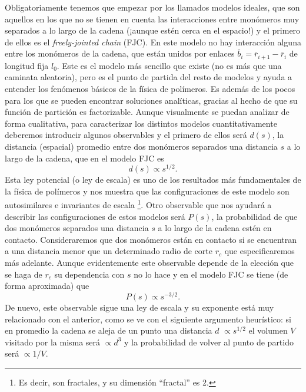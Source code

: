 Obligatoriamente tenemos que empezar por los llamados modelos ideales, que son aquellos en los que no se tienen en cuenta las interacciones entre monómeros muy separados a lo largo de la cadena (¡aunque estén cerca en el espacio!) y el primero de ellos es el \textit{freely-jointed chain} (FJC). En este modelo no hay interacción alguna entre los monómeros de la cadena, que están unidos por enlaces $\bar{b}_i=\bar{r}_{i+1}-\bar{r}_i$ de longitud fija $l_0$. Este es el modelo más sencillo que existe (no es más que una caminata aleatoria), pero es el punto de partida del resto de modelos y ayuda a entender los fenómenos básicos de la física de polímeros. Es además de los pocos para los que se pueden encontrar soluciones analíticas, gracias al hecho de que su función de partición es factorizable. Aunque visualmente se puedan analizar de forma cualitativa, para caracterizar los distintos modelos cuantitativamente deberemos introducir algunos observables y el primero de ellos será $d(s)$, la distancia (espacial) promedio entre dos monómeros separados una distancia $s$ a lo largo de la cadena, que en el modelo FJC es \cite{Theodorakopoulos2019}
\begin{equation}
    \label{eq:ideal_sd}
    d(s)\propto s^{1/2}.
\end{equation}
Esta ley potencial (o ley de escala) es uno de los resultados más fundamentales de la física de polímeros y nos muestra que las configuraciones de este modelo son autosimilares e invariantes de escala \footnote{Es decir, son fractales, y su dimensión ``fractal'' es 2.}. Otro observable que nos ayudará a describir las configuraciones de estos modelos será $P(s)$, la probabilidad de que dos monómeros separados una distancia $s$ a lo largo de la cadena estén en contacto. Consideraremos que dos monómeros están en contacto si se encuentran a una distancia menor que un determinado radio de corte $r_c$ que especificaremos más adelante. Aunque evidentemente este observable depende de la elección que se haga de $r_c$ su dependencia con $s$ no lo hace y en el modelo FJC se tiene (de forma aproximada) que \cite{Kloczkowski1999}
\begin{equation}
    \label{eq:ideal_cp}
    P(s)\propto s^{-3/2}.
\end{equation}
De nuevo, este observable sigue una ley de escala y su exponente está muy relacionado con el anterior, como se ve con el siguiente argumento heurístico: si en promedio la cadena se aleja de un punto una distancia $d$ $\propto s^{1/2}$ el volumen $V$ visitado por la misma será $\propto d^3$ y la probabilidad de volver al punto de partido será $\propto 1/V$.

